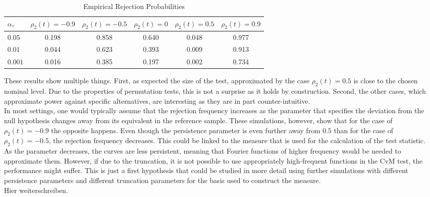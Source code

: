 \documentclass[12pt, a4paper]{article}
\theoremstyle{MAstyle} \newtheorem{assumption}{Assumption}[section]
\theoremstyle{MAstyle} \newtheorem{definition}{Definition}[section]
\theoremstyle{MAstyle} \newtheorem{theorem}{Theorem}[section]
\begin{document}
		\begin{table}[H]
			\centering
			\begin{tabular}{l|ccccc}\toprule
				$\alpha_{\tau}$ &$\rho_2(t) = -0.9$ &$\rho_2(t) = -0.5$ &$\rho_2(t) = 0$ &$\rho_2(t) = 0.5$ &$\rho_2(t) = 0.9$\\
				\midrule
				$0.05$	& 0.198 & 0.858  &  0.640 & 0.048   & 0.977  \\
				$0.01$ 	& 0.044	& 0.623  &  0.393 & 0.009   & 0.913  \\
				$0.001$	& 0.016	& 0.385  &  0.197 & 0.002   & 0.734  \\
				\bottomrule
			\end{tabular}
			\caption{Empirical Rejection Probabilities}
			\label{rej_probs_cor}
		\end{table}
		These results show multiple things. First, as expected the size of the test, approximated by the case $\rho_2(t) = 0.5$ is close to the chosen nominal level. Due to the properties of permutation tests, this is not a surprise as it holds by construction. Second, the other cases, which approximate power against specific alternatives, are interesting as they are in part counter-intuitive.\\
		
		In most settings, one would typically assume that the rejection frequency increases as the parameter that specifies the deviation from the null hypothesis changes away from its equivalent in the reference sample. These simulations, however, show that for the case of $\rho_2(t) = -0.9$ the opposite happens. Even though the persistence parameter is even further away from $0.5$ than for the case of $\rho_2(t) = -0.5$, the rejection frequency decreases. This could be linked to the measure that is used for the calculation of the test statistic. As the parameter decreases, the curves are less persistent, meaning that Fourier functions of higher frequency would be needed to approximate them. However, if due to the truncation, it is not possible to use appropriately high-frequent functions in the CvM test, the performance might suffer. This is just a first hypothesis that could be studied in more detail using further simulations with different persistence parameters and different truncation parameters for the basis used to construct the measure.\\
		
		{\color{red} Hier weiterschreiben.}
				
\end{document}

